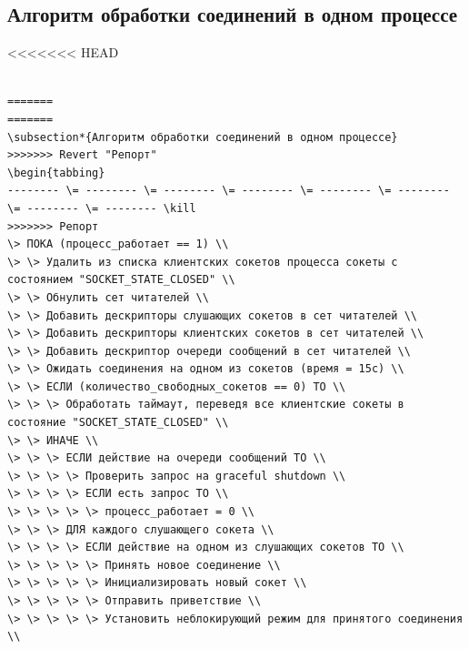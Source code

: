 \documentclass[a4paper,12pt]{report}
\begin{document}
\subsection{Алгоритм обработки соединений в одном процессе}
<<<<<<< HEAD
\begin{verbatim}

=======
=======
\subsection*{Алгоритм обработки соединений в одном процессе}
>>>>>>> Revert "Репорт"
\begin{tabbing}
-------- \= -------- \= -------- \= -------- \= -------- \= -------- \= -------- \= -------- \kill
>>>>>>> Репорт
\> ПОКА (процесс_работает == 1) \\
\> \> Удалить из списка клиентских сокетов процесса сокеты с состоянием "SOCKET_STATE_CLOSED" \\
\> \> Обнулить сет читателей \\
\> \> Добавить дескрипторы слушающих сокетов в сет читателей \\
\> \> Добавить дескрипторы клиентских сокетов в сет читателей \\
\> \> Добавить дескриптор очереди сообщений в сет читателей \\ 
\> \> Ожидать соединения на одном из сокетов (время = 15с) \\
\> \> ЕСЛИ (количество_свободных_сокетов == 0) ТО \\
\> \> \> Обработать таймаут, переведя все клиентские сокеты в состояние "SOCKET_STATE_CLOSED" \\
\> \> ИНАЧЕ \\
\> \> \> ЕСЛИ действие на очереди сообщений ТО \\
\> \> \> \> Проверить запрос на graceful shutdown \\
\> \> \> \> ЕСЛИ есть запрос ТО \\
\> \> \> \> \> процесс_работает = 0 \\
\> \> \> ДЛЯ каждого слушающего сокета \\
\> \> \> \> ЕСЛИ действие на одном из слушающих сокетов ТО \\
\> \> \> \> \> Принять новое соединение \\
\> \> \> \> \> Инициализировать новый сокет \\
\> \> \> \> \> Отправить приветствие \\
\> \> \> \> \> Установить неблокирующий режим для принятого соединения \\

\end{verbatim}
\end{document}
